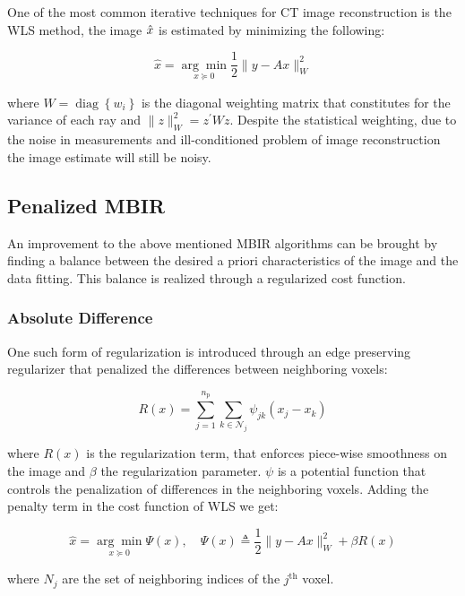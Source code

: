 One of the most common iterative techniques for \ac{CT} image reconstruction is the \ac{WLS} method, the image $\hat{x}$ is estimated by minimizing the following:

\begin{equation}
\hat{x}=\underset{x \succeq 0}{\arg \min } \frac{1}{2}\|y-A x\|_{W}^{2}
\end{equation}

where $W=\operatorname{diag}\left\{w_{i}\right\}$ is the diagonal weighting matrix that constitutes for the variance of each ray and $\|z\|_{W}^{2}=z^{\prime} W z$. Despite the statistical weighting, due to the noise in measurements and ill-conditioned problem of image reconstruction the image estimate will still be noisy. 

\subsection{Penalized MBIR}
An improvement to the above mentioned \ac{MBIR} algorithms can be brought by finding a balance between the desired a priori characteristics of the image and the data fitting. This balance is realized through a regularized cost function.

\subsubsection{Absolute Difference}
One such form of regularization is introduced through an edge preserving regularizer that penalized the differences between neighboring voxels:

\begin{equation}
R(x)=\sum_{j=1}^{n_{\mathrm{p}}} \sum_{k \in \mathcal{N}_{j}} \psi_{j k}\left(x_{j}-x_{k}\right)
\end{equation}

where $R(x)$ is the regularization term, that enforces piece-wise smoothness on the image and $\beta$ the regularization parameter. $\psi$ is a potential function that controls the penalization of differences in the neighboring voxels. Adding the penalty term in the cost function of \ac{WLS} we get:
 
\begin{equation}
\hat{x}=\underset{x \succeq 0}{\arg \min } \Psi(x), \quad \Psi(x) \triangleq \frac{1}{2}\|y-A x\|_{W}^{2}+\beta R(x)
\end{equation} 
   

where $N_j$ are the set of neighboring indices of the $j^\mathrm{th}$ voxel. 


